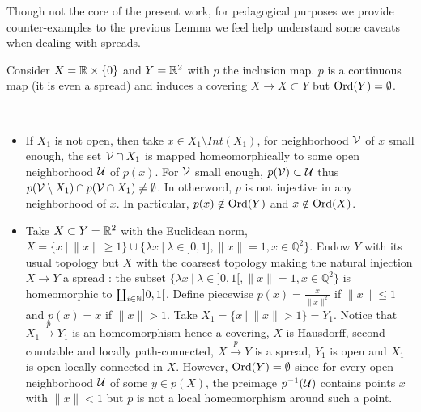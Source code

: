 Though not the core of the present work, for pedagogical purposes we provide counter-examples to the previous Lemma we feel help understand some caveats when dealing with spreads.
\begin{cex}[Openess of $Y_1$]\label{cex:openess}

 Consider $X = \mathbb R\times \{0\} $ and $Y = \mathbb R^2$ with $p$ the inclusion map. $p$ is a continuous map (it is even a spread) and induces a covering $X\rightarrow X \subset Y$ but $\mathrm{Ord}(Y)=\emptyset$.
\end{cex}
\begin{cex}[Portlyness of $X_1$]\label{cex:portlyness} \ 
\begin{itemize}
 \item If $X_1$ is not open, then take $x \in X_1\setminus Int(X_1)$, for neighborhood $\mathcal V$ of $x$ small enough, the set $\mathcal V\cap X_1$ is mapped homeomorphically to some open neighborhood $\mathcal{U}$ of $p(x)$. For $\mathcal V$ small enough, $p(\mathcal V)\subset \mathcal{U}$ thus $p(\mathcal V\setminus X_1) \cap p(\mathcal V\cap X_1)\neq \emptyset$. In otherword, $p$ is not injective in any neighborhood of $x$. 
 In particular, $p(x)\notin \mathrm{Ord}(Y)$ and  $x\notin \mathrm{Ord}(X)$.
 \item  Take $X\subset Y=\mathbb R^2$ with the Euclidean norm,
 $X=\{x~|~\|x\|\geq 1\} \cup \{\lambda x ~|~ \lambda \in ]0,1], \|x\|=1, x\in \mathbb Q^2\}$.  Endow $Y$ with its usual topology but $X$ with the coarsest topology making the natural injection $X\rightarrow Y$ a spread : the subset $\{\lambda x ~|~ \lambda \in ]0,1[, \|x\|=1, x\in \mathbb Q^2\}$ is homeomorphic to $\coprod_{i\in \mathbb{N}} ]0,1[$. 
  Define piecewise $p(x) = \frac{x}{\|x\|^2}$ if $\|x\|\leq 1$ and $p(x) = x$ if $\|x\|>1$. Take $X_1=\{x~|~\|x\|>1\}=Y_1$. Notice that $X_1\xrightarrow{p} Y_1$ is an homeomorphism hence a covering, $X$ is Hausdorff, second countable and locally path-connected, $X\xrightarrow{p}Y$ is a spread, $Y_1$ is open and $X_1$ is open locally connected in $X$.  However, $\mathrm{Ord}(Y)=\emptyset$ since for every open neighborhood $\mathcal{U}$ of some $y\in p(X)$, the preimage $p^{-1}(\mathcal{U})$ contains points $x$ with $\|x\|<1$ but $p$ is not a local homeomorphism around such a point. 
\end{itemize}

\end{cex}





